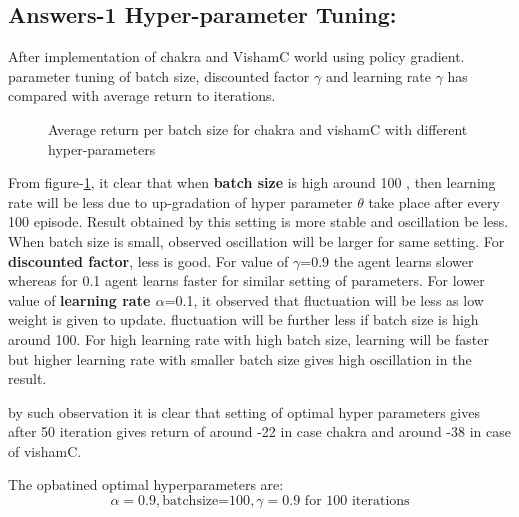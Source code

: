 \documentclass[preprint,12pt]{elsarticle}
\begin{document}
\subsection{Answers-1 Hyper-parameter Tuning:}
After implementation of chakra and VishamC world using policy gradient. parameter tuning of batch size, discounted factor $\gamma$ and learning rate $\gamma$ has compared with average return to iterations.


 \begin{figure}[H]
 	\centering  
 	\caption{Average return per batch size for chakra and vishamC with different hyper-parameters}
 	\label{fig:Preturn}
 \end{figure}
 
 From figure-\ref{fig:Preturn}, it clear that when\textbf{ batch size} is high around 100 , then learning rate will be less due to up-gradation of hyper parameter $\theta$ take place after every 100 episode. Result obtained by this setting is more stable and oscillation be less. When batch size is small, observed oscillation will be larger for same setting. For \textbf{discounted factor}, less is good. For value of $\gamma$=0.9 the agent learns slower whereas for 0.1 agent learns faster for similar setting of parameters. For lower value of \textbf{learning rate $\alpha$}=0.1, it observed that fluctuation will be less as low weight is given to update. fluctuation will be further less if batch size is high around 100. For high learning rate with high batch size, learning will be faster but higher learning rate with smaller batch size gives high oscillation in the result.
 
by such observation it is clear that setting of optimal hyper parameters gives after 50 iteration gives return of around -22 in case chakra and around -38 in case of vishamC.

The opbatined optimal hyperparameters are:
\begin{equation}
 \alpha =0.9 , 	\text{batchsize=100}, \gamma =0.9 \text{  for 100 iterations}
\end{equation}
 
 
\end{document}
